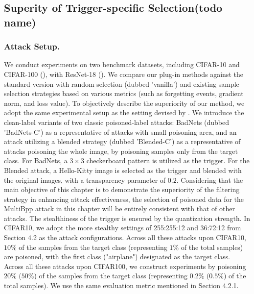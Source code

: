 \documentclass{article}
\begin{document}
\subsection{Superity of Trigger-specific Selection(todo name)}
\subsubsection{Attack Setup.}
We conduct experiments on two benchmark datasets, including CIFAR-10 and CIFAR-100 (\cite{krizhevsky2009learning}), with ResNet-18 (\cite{he2016deep}). We compare our plug-in methods against the standard version with random selection (dubbed 'vanilla') and existing sample selection strategies based on various metrics (such as forgetting events, gradient norm, and loss value). To objectively describe the superiority of our method, we adopt the same experimental setup as the setting devised by \citet{gao2023not}. We introduce the clean-label variants of two classic poisoned-label attacks: BadNets (dubbed 'BadNets-C') as a representative of attacks with small poisoning area, and an attack utilizing a blended strategy (dubbed 'Blended-C') as a representative of attacks poisoning the whole image, by poisoning samples only from the target class. For BadNets, a \(3 \times 3\) checkerboard pattern is utilized as the trigger. For the Blended attack, a Hello-Kitty image is selected as the trigger and blended with the original images, with a transparency parameter of \(0.2\). Considering that the main objective of this chapter is to demonstrate the superiority of the filtering strategy in enhancing attack effectiveness, the selection of poisoned data for the MultiBpp attack in this chapter will be entirely consistent with that of other attacks. The stealthiness of the trigger is ensured by the quantization strength. In CIFAR10, we adopt the more stealthy settings of 255:255:12 and 36:72:12 from Section 4.2 as the attack configurations. Across all these attacks upon CIFAR10, \(10\%\) of the samples from the target class (representing \(1\%\) of the total samples) are poisoned, with the first class ("airplane") designated as the target class. Across all these attacks upon CIFAR100, we construct experiments by poisoning \(20\%\) (\(50\%\)) of the samples from the target class (representing \(0.2\%\) (\(0.5\%\)) of the total samples). We use the same evaluation metric mentioned in Section 4.2.1.
\end{document}
